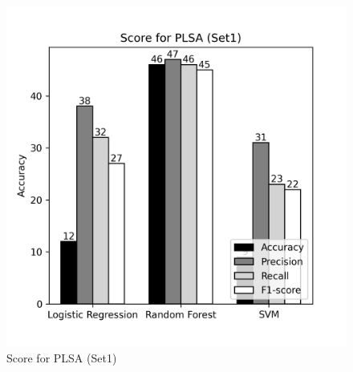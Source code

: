 \documentclass[12pt]{report}
\begin{document}
\begin{figure}[!htb]
\begin{minipage}{0.48\textwidth}
                  \includegraphics[scale=0.55]{plots/Score for PLSA (Set1).png}
                  \caption{Score for PLSA (Set1)}\label{Fig:typo2}
                \end{minipage}
             \end{figure}
            
\end{document}
